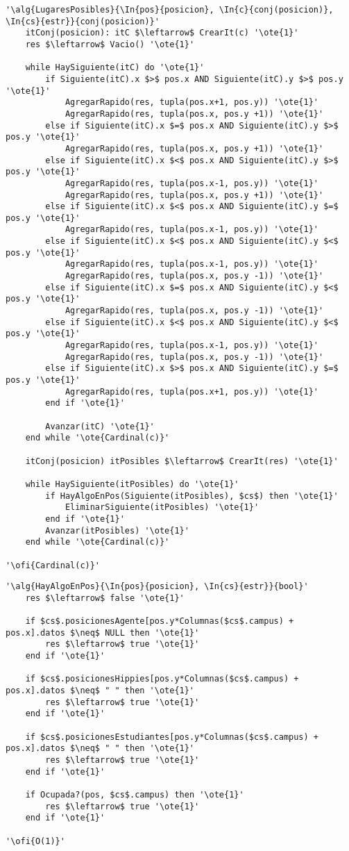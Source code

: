 \begin{lstlisting}[mathescape]
'\alg{LugaresPosibles}{\In{pos}{posicion}, \In{c}{conj(posicion)}, \In{cs}{estr}}{conj(posicion)}'
	itConj(posicion): itC $\leftarrow$ CrearIt(c) '\ote{1}'
	res $\leftarrow$ Vacio() '\ote{1}'
	
	while HaySiguiente(itC) do '\ote{1}'
		if Siguiente(itC).x $>$ pos.x AND Siguiente(itC).y $>$ pos.y '\ote{1}'
			AgregarRapido(res, tupla(pos.x+1, pos.y)) '\ote{1}'
			AgregarRapido(res, tupla(pos.x, pos.y +1)) '\ote{1}'
		else if Siguiente(itC).x $=$ pos.x AND Siguiente(itC).y $>$ pos.y '\ote{1}'
			AgregarRapido(res, tupla(pos.x, pos.y +1)) '\ote{1}'
		else if Siguiente(itC).x $<$ pos.x AND Siguiente(itC).y $>$ pos.y '\ote{1}'
			AgregarRapido(res, tupla(pos.x-1, pos.y)) '\ote{1}'
			AgregarRapido(res, tupla(pos.x, pos.y +1)) '\ote{1}'
		else if Siguiente(itC).x $<$ pos.x AND Siguiente(itC).y $=$ pos.y '\ote{1}'
			AgregarRapido(res, tupla(pos.x-1, pos.y)) '\ote{1}'
		else if Siguiente(itC).x $<$ pos.x AND Siguiente(itC).y $<$ pos.y '\ote{1}'
			AgregarRapido(res, tupla(pos.x-1, pos.y)) '\ote{1}'
			AgregarRapido(res, tupla(pos.x, pos.y -1)) '\ote{1}'
		else if Siguiente(itC).x $=$ pos.x AND Siguiente(itC).y $<$ pos.y '\ote{1}'
			AgregarRapido(res, tupla(pos.x, pos.y -1)) '\ote{1}'
		else if Siguiente(itC).x $<$ pos.x AND Siguiente(itC).y $<$ pos.y '\ote{1}'
			AgregarRapido(res, tupla(pos.x-1, pos.y)) '\ote{1}'
			AgregarRapido(res, tupla(pos.x, pos.y -1)) '\ote{1}'
		else if Siguiente(itC).x $>$ pos.x AND Siguiente(itC).y $=$ pos.y '\ote{1}'
			AgregarRapido(res, tupla(pos.x+1, pos.y)) '\ote{1}'
		end if '\ote{1}'
		
		Avanzar(itC) '\ote{1}'
	end while '\ote{Cardinal(c)}'
	
	itConj(posicion) itPosibles $\leftarrow$ CrearIt(res) '\ote{1}'
	
	while HaySiguiente(itPosibles) do '\ote{1}'
		if HayAlgoEnPos(Siguiente(itPosibles), $cs$) then '\ote{1}'
			EliminarSiguiente(itPosibles) '\ote{1}'
		end if '\ote{1}'
		Avanzar(itPosibles) '\ote{1}'
	end while '\ote{Cardinal(c)}'

'\ofi{Cardinal(c)}'
\end{lstlisting}

\begin{lstlisting}[mathescape]
'\alg{HayAlgoEnPos}{\In{pos}{posicion}, \In{cs}{estr}}{bool}'
	res $\leftarrow$ false '\ote{1}'
	
	if $cs$.posicionesAgente[pos.y*Columnas($cs$.campus) + pos.x].datos $\neq$ NULL then '\ote{1}'
		res $\leftarrow$ true '\ote{1}'
	end if '\ote{1}'

	if $cs$.posicionesHippies[pos.y*Columnas($cs$.campus) + pos.x].datos $\neq$ " " then '\ote{1}'
		res $\leftarrow$ true '\ote{1}'
	end if '\ote{1}'

	if $cs$.posicionesEstudiantes[pos.y*Columnas($cs$.campus) + pos.x].datos $\neq$ " " then '\ote{1}'
		res $\leftarrow$ true '\ote{1}'
	end if '\ote{1}'
	
	if Ocupada?(pos, $cs$.campus) then '\ote{1}'
		res $\leftarrow$ true '\ote{1}'
	end if '\ote{1}'

'\ofi{O(1)}'
\end{lstlisting}

